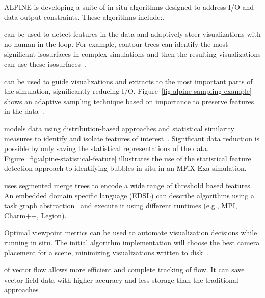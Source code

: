 ALPINE is developing a suite of in situ  algorithms designed to address I/O and data output constraints.   These algorithms include:.  
\begin{description}  
	\setlength{\itemsep}{1pt}
    \setlength{\parskip}{0pt}
    \setlength{\parsep}{0pt}
	\item [Topological analysis] can be used to detect features in the data and adaptively steer visualizations with no human in the loop.  For example, contour trees can identify the most significant isosurfaces in complex simulations and then the resulting visualizations can use these isosurfaces~\cite{alpine:Carr:TVCG19}.
	\item [Adaptive sampling]  can be used to guide visualizations and extracts to the most important parts of the simulation, significantly reducing I/O.  Figure~\ref{fig:alpine-sampling-example} shows an adaptive sampling technique based on importance to preserve  features in the data~\cite{alpine:Biswas:ISAV18,alpine:Dutta:Entropy19,alpine:Liu:SC19poster}.  
	\item [Statistical feature detection] models data using distribution-based approaches and statistical similarity measures to identify and isolate features of interest~\cite{alpine:Dutta:PVIS17,alpine:Dutta:VIS15}. Significant data reduction is possible by only saving the statistical representations of the data.  Figure~\ref{fig:alpine-statistical-feature} illustrates the use of the statistical feature detection approach to identifying bubbles in situ in an MFiX-Exa simulation.  
	\item [Task-based feature extraction] uses segmented merge trees to encode a wide range of threshold based features.  An embedded domain specific language (EDSL) can describe algorithms using a  task graph abstraction~\cite{alpine:Landge:SC14,alpine:Petruzza:IPDPS18} and execute it using different runtimes (e.g., MPI, Charm++, Legion).
	\item [Optimal Viewpoint] Optimal viewpoint metrics can be used to automate visualization decisions while running in situ.  The initial algorithm implementation will choose the best camera placement for a scene, minimizing visualizations written to disk~\cite{alpine:Bonaventura:Entropy18,alpine:Marsaglia:UOtech20}.  
	\item [Lagrangian analysis] of vector flow allows more efficient and complete tracking of flow.  It can save vector field data with higher accuracy and less storage than the traditional approaches~\cite{alpine:Sane:EGPGV18,alpine:Sane:EGPGV19,alpine:Binyahib:LDAV19}.
\end{description}

